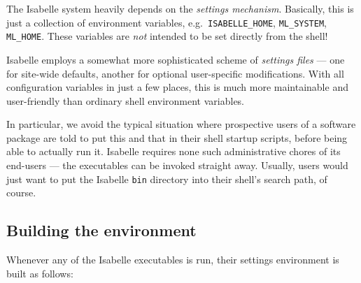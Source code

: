 The Isabelle system heavily depends on the \emph{settings
  mechanism}. Basically, this is just a collection
of environment variables, e.g.\ \texttt{ISABELLE_HOME},
\texttt{ML_SYSTEM}, \texttt{ML_HOME}.  These variables are \emph{not}
intended to be set directly from the shell!

Isabelle employs a somewhat more sophisticated scheme of
\emph{settings files} --- one for site-wide defaults, another for
optional user-specific modifications.  With all configuration
variables in just a few places, this is much more maintainable and
user-friendly than ordinary shell environment variables.

In particular, we avoid the typical situation where prospective users
of a software package are told to put this and that in their shell
startup scripts, before being able to actually run it. Isabelle
requires none such administrative chores of its end-users --- the
executables can be invoked straight away. Usually, users would just
want to put the Isabelle \texttt{bin} directory into their shell's
search path, of course.


\subsection{Building the environment}

Whenever any of the Isabelle executables is run, their settings
environment is built as follows:

